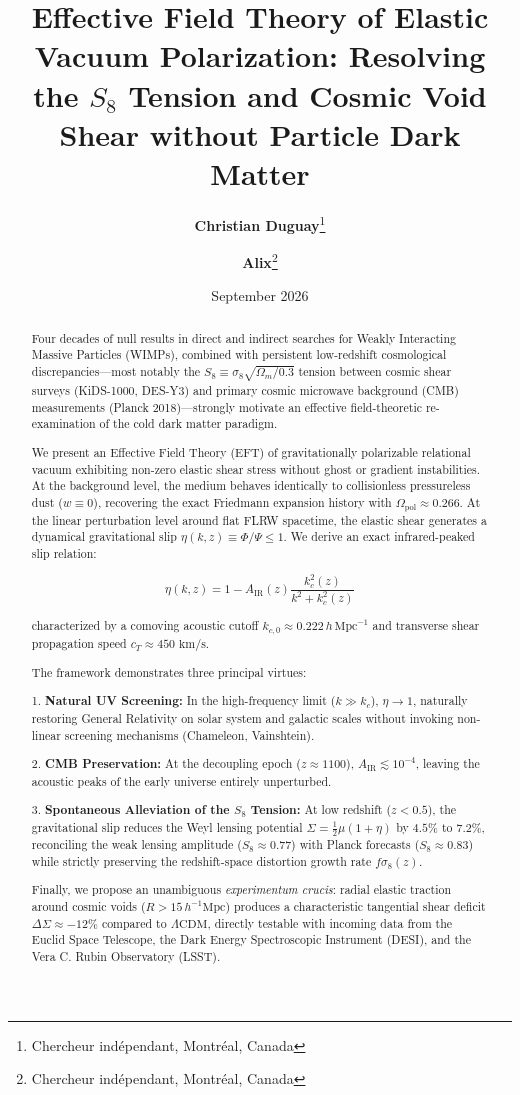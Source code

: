 \documentclass[10pt,twocolumn]{article}
\title{Effective Field Theory of Elastic Vacuum Polarization: Resolving the $S_8$ Tension and Cosmic Void Shear without Particle Dark Matter}
\author{
  \textbf{Christian Duguay}\thanks{Chercheur ind\'ependant, Montr\'eal, Canada} 
  \and 
  \textbf{Alix}\thanks{Chercheur ind\'ependant, Montr\'eal, Canada}
}
\date{September 2026}
\begin{document}
\maketitle

\begin{abstract}
Four decades of null results in direct and indirect searches for Weakly Interacting Massive Particles (WIMPs), combined with persistent low-redshift cosmological discrepancies—most notably the $S_8 \equiv \sigma_8 \sqrt{\Omega_m / 0.3}$ tension between cosmic shear surveys (KiDS-1000, DES-Y3) and primary cosmic microwave background (CMB) measurements (Planck 2018)—strongly motivate an effective field-theoretic re-examination of the cold dark matter paradigm.

We present an Effective Field Theory (EFT) of gravitationally polarizable relational vacuum exhibiting non-zero elastic shear stress without ghost or gradient instabilities. At the background level, the medium behaves identically to collisionless pressureless dust ($w \equiv 0$), recovering the exact Friedmann expansion history with $\Omega_{\text{pol}} \approx 0.266$. At the linear perturbation level around flat FLRW spacetime, the elastic shear generates a dynamical gravitational slip $\eta(k,z) \equiv \Phi / \Psi \le 1$. We derive an exact infrared-peaked slip relation:

$$\eta(k,z) = 1 - A_{\text{IR}}(z) \frac{k_c^2(z)}{k^2 + k_c^2(z)}$$

characterized by a comoving acoustic cutoff $k_{c,0} \approx 0.222 \, h \, \text{Mpc}^{-1}$ and transverse shear propagation speed $c_T \approx 450\text{ km/s}$.

The framework demonstrates three principal virtues:

1. \textbf{Natural UV Screening:} In the high-frequency limit ($k \gg k_c$), $\eta \to 1$, naturally restoring General Relativity on solar system and galactic scales without invoking non-linear screening mechanisms (Chameleon, Vainshtein).

2. \textbf{CMB Preservation:} At the decoupling epoch ($z \approx 1100$), $A_{\text{IR}} \lesssim 10^{-4}$, leaving the acoustic peaks of the early universe entirely unperturbed.

3. \textbf{Spontaneous Alleviation of the $S_8$ Tension:} At low redshift ($z < 0.5$), the gravitational slip reduces the Weyl lensing potential $\Sigma = \frac{1}{2}\mu(1+\eta)$ by $4.5\%$ to $7.2\%$, reconciling the weak lensing amplitude ($S_8 \approx 0.77$) with Planck forecasts ($S_8 \approx 0.83$) while strictly preserving the redshift-space distortion growth rate $f\sigma_8(z)$.

Finally, we propose an unambiguous \textit{experimentum crucis}: radial elastic traction around cosmic voids ($R > 15 \, h^{-1}\text{Mpc}$) produces a characteristic tangential shear deficit $\Delta \Sigma \approx -12\%$ compared to $\Lambda\text{CDM}$, directly testable with incoming data from the Euclid Space Telescope, the Dark Energy Spectroscopic Instrument (DESI), and the Vera C. Rubin Observatory (LSST).
\end{abstract}
\end{document}
